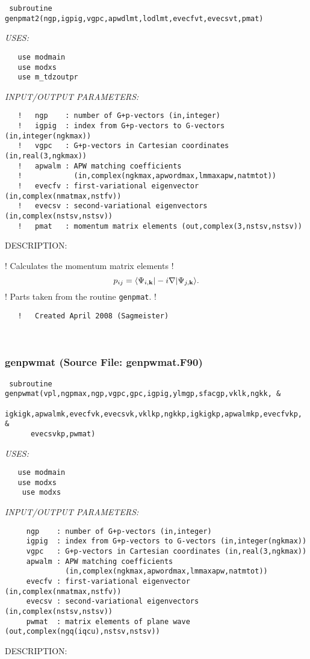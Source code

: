 \documentclass[11pt]{article}
\begin{document}
\begin{verbatim} subroutine genpmat2(ngp,igpig,vgpc,apwdlmt,lodlmt,evecfvt,evecsvt,pmat)\end{verbatim}{\em USES:}
\begin{verbatim}   use modmain
   use modxs
   use m_tdzoutpr\end{verbatim}{\em INPUT/OUTPUT PARAMETERS:}
\begin{verbatim}   !   ngp    : number of G+p-vectors (in,integer)
   !   igpig  : index from G+p-vectors to G-vectors (in,integer(ngkmax))
   !   vgpc   : G+p-vectors in Cartesian coordinates (in,real(3,ngkmax))
   !   apwalm : APW matching coefficients
   !            (in,complex(ngkmax,apwordmax,lmmaxapw,natmtot))
   !   evecfv : first-variational eigenvector (in,complex(nmatmax,nstfv))
   !   evecsv : second-variational eigenvectors (in,complex(nstsv,nstsv))
   !   pmat   : momentum matrix elements (out,complex(3,nstsv,nstsv))\end{verbatim}
{\sf DESCRIPTION:\\ }


   !   Calculates the momentum matrix elements
   !   $$ p_{ij}=\langle\Psi_{i,{\bf k}}|-i\nabla|\Psi_{j,{\bf k}}\rangle. $$
   !   Parts taken from the routine {\tt genpmat}.
   !
\begin{verbatim}   !   Created April 2008 (Sagmeister)\end{verbatim}


 
 
\mbox{}\hrulefill\ 
 
\subsubsection{genpwmat (Source File: genpwmat.F90)}


\begin{verbatim} subroutine genpwmat(vpl,ngpmax,ngp,vgpc,gpc,igpig,ylmgp,sfacgp,vklk,ngkk, &
      igkigk,apwalmk,evecfvk,evecsvk,vklkp,ngkkp,igkigkp,apwalmkp,evecfvkp, &
      evecsvkp,pwmat)\end{verbatim}{\em USES:}
\begin{verbatim}   use modmain
   use modxs
    use modxs\end{verbatim}{\em INPUT/OUTPUT PARAMETERS:}
\begin{verbatim}     ngp    : number of G+p-vectors (in,integer)
     igpig  : index from G+p-vectors to G-vectors (in,integer(ngkmax))
     vgpc   : G+p-vectors in Cartesian coordinates (in,real(3,ngkmax))
     apwalm : APW matching coefficients
              (in,complex(ngkmax,apwordmax,lmmaxapw,natmtot))
     evecfv : first-variational eigenvector (in,complex(nmatmax,nstfv))
     evecsv : second-variational eigenvectors (in,complex(nstsv,nstsv))
     pwmat  : matrix elements of plane wave (out,complex(ngq(iqcu),nstsv,nstsv))\end{verbatim}
{\sf DESCRIPTION:\\ }
\end{document}
